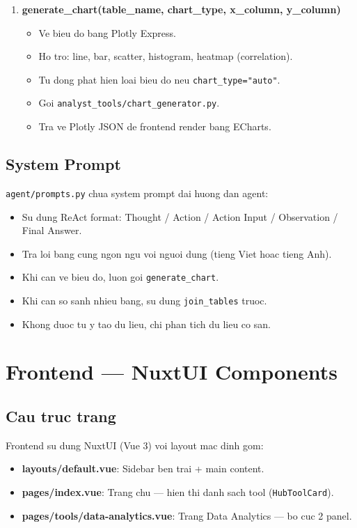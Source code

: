 \documentclass[12pt,a4paper]{article}
\begin{document}
\begin{enumerate}
  \item \textbf{generate\_chart(table\_name, chart\_type, x\_column,
        y\_column)}
        \begin{itemize}
          \item Ve bieu do bang Plotly Express.
          \item Ho tro: line, bar, scatter, histogram, heatmap (correlation).
          \item Tu dong phat hien loai bieu do neu \texttt{chart\_type="auto"}.
          \item Goi \texttt{analyst\_tools/chart\_generator.py}.
          \item Tra ve Plotly JSON de frontend render bang ECharts.
        \end{itemize}
\end{enumerate}

\subsection{System Prompt}

\texttt{agent/prompts.py} chua system prompt dai huong dan agent:

\begin{itemize}
  \item Su dung ReAct format: Thought / Action / Action Input /
        Observation / Final Answer.
  \item Tra loi bang cung ngon ngu voi nguoi dung (tieng Viet hoac tieng Anh).
  \item Khi can ve bieu do, luon goi \texttt{generate\_chart}.
  \item Khi can so sanh nhieu bang, su dung \texttt{join\_tables} truoc.
  \item Khong duoc tu y tao du lieu, chi phan tich du lieu co san.
\end{itemize}

\section{Frontend --- NuxtUI Components}

\subsection{Cau truc trang}

Frontend su dung NuxtUI (Vue 3) voi layout mac dinh gom:
\begin{itemize}
  \item \textbf{layouts/default.vue}: Sidebar ben trai + main content.
  \item \textbf{pages/index.vue}: Trang chu --- hien thi danh sach tool
        (\texttt{HubToolCard}).
  \item \textbf{pages/tools/data-analytics.vue}: Trang Data Analytics ---
        bo cuc 2 panel.
\end{itemize}
\end{document}
